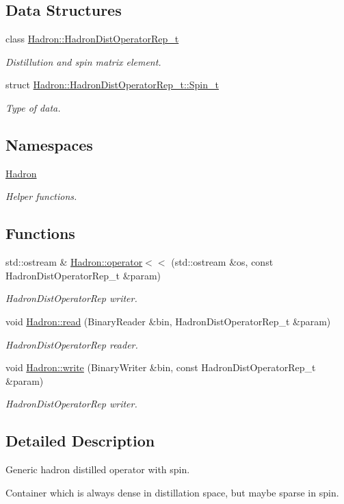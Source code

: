 \subsection*{Data Structures}
\begin{DoxyCompactItemize}
\item 
class \mbox{\hyperlink{classHadron_1_1HadronDistOperatorRep__t}{Hadron\+::\+Hadron\+Dist\+Operator\+Rep\+\_\+t}}
\begin{DoxyCompactList}\small\item\em Distillution and spin matrix element. \end{DoxyCompactList}\item 
struct \mbox{\hyperlink{structHadron_1_1HadronDistOperatorRep__t_1_1Spin__t}{Hadron\+::\+Hadron\+Dist\+Operator\+Rep\+\_\+t\+::\+Spin\+\_\+t}}
\begin{DoxyCompactList}\small\item\em Type of data. \end{DoxyCompactList}\end{DoxyCompactItemize}
\subsection*{Namespaces}
\begin{DoxyCompactItemize}
\item 
 \mbox{\hyperlink{namespaceHadron}{Hadron}}
\begin{DoxyCompactList}\small\item\em Helper functions. \end{DoxyCompactList}\end{DoxyCompactItemize}
\subsection*{Functions}
\begin{DoxyCompactItemize}
\item 
std\+::ostream \& \mbox{\hyperlink{namespaceHadron_a4ff4eac2687982e6a251bf3524940b01}{Hadron\+::operator$<$$<$}} (std\+::ostream \&os, const Hadron\+Dist\+Operator\+Rep\+\_\+t \&param)
\begin{DoxyCompactList}\small\item\em Hadron\+Dist\+Operator\+Rep writer. \end{DoxyCompactList}\item 
void \mbox{\hyperlink{namespaceHadron_adeba574c3428db28a2e7054d5f4d32d6}{Hadron\+::read}} (Binary\+Reader \&bin, Hadron\+Dist\+Operator\+Rep\+\_\+t \&param)
\begin{DoxyCompactList}\small\item\em Hadron\+Dist\+Operator\+Rep reader. \end{DoxyCompactList}\item 
void \mbox{\hyperlink{namespaceHadron_a9edaeb80eb507096c7529be211efa667}{Hadron\+::write}} (Binary\+Writer \&bin, const Hadron\+Dist\+Operator\+Rep\+\_\+t \&param)
\begin{DoxyCompactList}\small\item\em Hadron\+Dist\+Operator\+Rep writer. \end{DoxyCompactList}\end{DoxyCompactItemize}


\subsection{Detailed Description}
Generic hadron distilled operator with spin. 

Container which is always dense in distillation space, but maybe sparse in spin. 